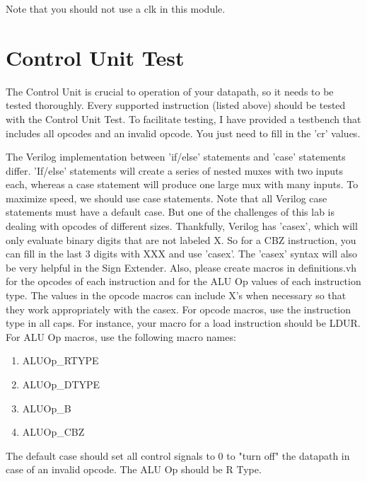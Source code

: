 Note that you should not use a clk in this module.

\section{Control Unit Test}
The Control Unit is crucial to operation of your datapath, so it needs to be tested thoroughly.  Every supported instruction (listed above) should be tested with the Control Unit Test.  To facilitate testing, I have provided a testbench that includes all opcodes and an invalid opcode.  You just need to fill in the 'cr' values.

The Verilog implementation between 'if/else' statements and 'case' statements differ.  'If/else' statements will create a series of nested muxes with two inputs each, whereas a case statement will produce one large mux with many inputs.  To maximize speed, we should use case statements. Note that all Verilog case statements must have a default case. But one of the challenges of this lab is dealing with opcodes of different sizes.  Thankfully, Verilog has 'casex', which will only evaluate binary digits that are not labeled X.  So for a CBZ instruction, you can fill in the last 3 digits with XXX and use 'casex'.  The 'casex' syntax will also be very helpful in the Sign Extender.  Also, please create macros in definitions.vh for the opcodes of each instruction and for the ALU Op values of each instruction type.  The values in the opcode macros can include X's when necessary so that they work appropriately with the casex.  For opcode macros, use the instruction type in all caps.  For instance, your macro for a load instruction should be LDUR.  For ALU Op macros,  use the following macro names:
\begin{enumerate}
	\item ALUOp\_RTYPE
	\item ALUOp\_DTYPE
	\item ALUOp\_B
	\item ALUOp\_CBZ
\end{enumerate} 

The default case should set all control signals to 0 to "turn off" the datapath in case of an invalid opcode.  The ALU Op should be R Type.

